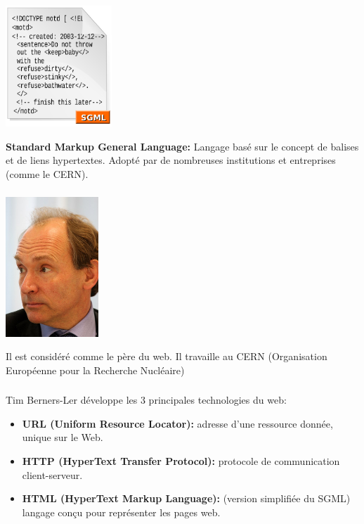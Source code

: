 \documentclass[svgnames,11pt]{beamer}
\begin{document}
\begin{frame}
    \frametitle{}

    \begin{center}
        \centering
        \includegraphics[width=4cm]{ressources/sgml.png}
        \label{IMG}
    \end{center}
    \begin{aretenir}[]
        \textbf{Standard Markup General Language:} Langage basé sur le concept de balises et de liens hypertextes. Adopté par de nombreuses institutions et entreprises (comme le CERN).
    \end{aretenir}
\end{frame}
\begin{frame}
    \frametitle{}

    \begin{center}
        \centering
        \includegraphics[width=3.5cm]{ressources/lee.jpg}
        \label{IMG}
    \end{center}
    \begin{aretenir}[]
        Il est considéré comme le père du web. Il travaille au CERN (Organisation Européenne pour la Recherche Nucléaire)
    \end{aretenir}
\end{frame}
\begin{frame}
    \frametitle{}

    Tim Berners-Ler développe les 3 principales technologies du web:
    \begin{itemize}
        \item<1-> \textbf{URL (Uniform Resource Locator): }adresse d'une ressource donnée, unique sur le Web.
        \item<2-> \textbf{HTTP (HyperText Transfer Protocol): }protocole de communication client-serveur.
        \item<3-> \textbf{HTML (HyperText Markup Language): } (version simplifiée du SGML) langage conçu pour représenter les pages web.
    \end{itemize}

\end{frame}
\end{document}
